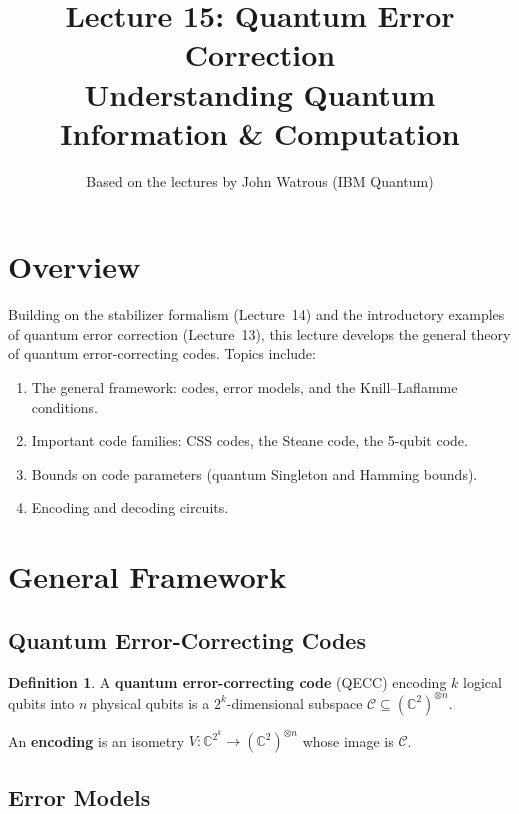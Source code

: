 \documentclass[11pt]{article}
\title{\textbf{Lecture 15: Quantum Error Correction} \\ \large Understanding Quantum Information \& Computation}
\author{Based on the lectures by John Watrous (IBM Quantum)}
\date{}
\theoremstyle{definition}
\newtheorem{definition}{Definition}[section]
\begin{document}
\maketitle
\tableofcontents
\newpage

\section{Overview}

Building on the stabilizer formalism (Lecture~14) and the introductory examples of quantum error correction (Lecture~13), this lecture develops the general theory of quantum error-correcting codes.  Topics include:

\begin{enumerate}
    \item The general framework: codes, error models, and the Knill--Laflamme conditions.
    \item Important code families: CSS codes, the Steane code, the 5-qubit code.
    \item Bounds on code parameters (quantum Singleton and Hamming bounds).
    \item Encoding and decoding circuits.
\end{enumerate}

\section{General Framework}

\subsection{Quantum Error-Correcting Codes}

\begin{definition}
A \textbf{quantum error-correcting code} (QECC) encoding $k$ logical qubits into $n$ physical qubits is a $2^k$-dimensional subspace $\mathcal{C}\subseteq(\mathbb{C}^2)^{\otimes n}$.
\end{definition}

An \textbf{encoding} is an isometry $V:\mathbb{C}^{2^k}\to(\mathbb{C}^2)^{\otimes n}$ whose image is $\mathcal{C}$.

\subsection{Error Models}
\end{document}
